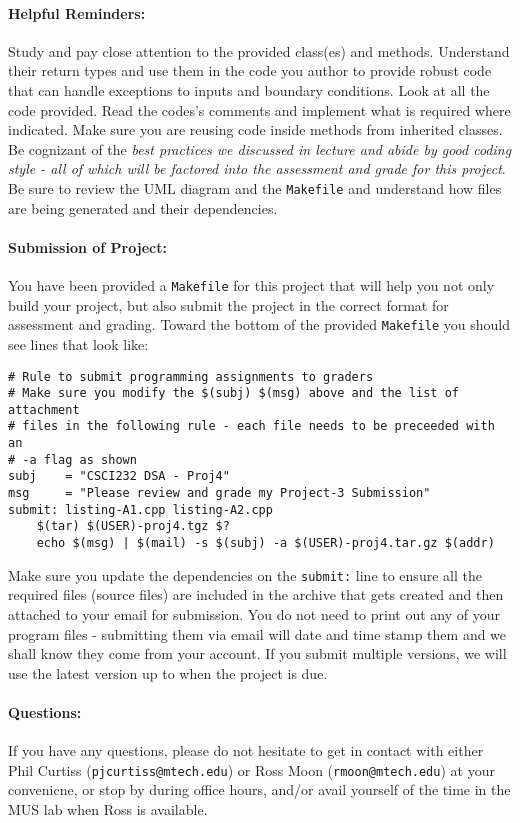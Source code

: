 \documentclass[10pt,letterpaper]{article}
\newcounter{x}\setcounter{x}{1}
\begin{document}
\paragraph{Helpful Reminders:} Study and pay close attention to the provided class(es) and methods. Understand their return types and use them in the code you author to provide robust code that can handle exceptions to inputs and boundary conditions. Look at all the code provided. Read the codes's comments and implement what is required where indicated. Make sure you are reusing code inside methods from inherited classes. Be cognizant of the {\em{}best practices we discussed in lecture and abide by good coding style - all of which will be factored into the assessment and grade for this project}. Be sure to review the UML diagram and the \verb|Makefile| and understand how files are being generated and their dependencies. 

\paragraph{Submission of Project:} You have been provided a \verb|Makefile| for this project that will help you not only build your project, but also submit the project in the correct format for assessment and grading. Toward the bottom of the provided \verb|Makefile| you should see lines that look like:

\begin{lstlisting}
# Rule to submit programming assignments to graders
# Make sure you modify the $(subj) $(msg) above and the list of attachment
# files in the following rule - each file needs to be preceeded with an
# -a flag as shown
subj    = "CSCI232 DSA - Proj4"
msg     = "Please review and grade my Project-3 Submission"
submit:	listing-A1.cpp listing-A2.cpp
	$(tar) $(USER)-proj4.tgz $?
	echo $(msg) | $(mail) -s $(subj) -a $(USER)-proj4.tar.gz $(addr)
\end{lstlisting}

Make sure you update the dependencies on the \verb|submit:| line to ensure all the required files (source files) are included in the archive that gets created and then attached to your email for submission. You do not need to print out any of your program files - submitting them via email will date and time stamp them and we shall know they come from your account. If you submit multiple versions, we will use the latest version up to when the project is due. 

\paragraph{Questions:} If you have any questions, please do not hesitate to get in contact with either Phil Curtiss (\verb|pjcurtiss@mtech.edu|) or Ross Moon (\verb|rmoon@mtech.edu|) at your convenicne, or stop by during office hours, and/or avail yourself of the time in the MUS lab when Ross is available. 
\end{document}
